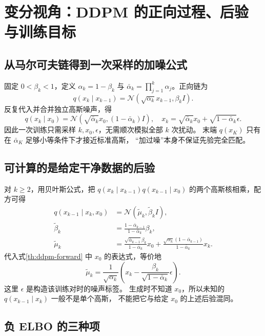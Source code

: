 \chapter{变分视角：DDPM 的正向过程、后验与训练目标}
\label{th:ddpm}

\section{从马尔可夫链得到一次采样的加噪公式}

固定 $0<\beta_k<1$，定义 $\alpha_k=1-\beta_k$ 与
$\bar\alpha_k=\prod_{j=1}^k\alpha_j$。正向链为
\[
q(x_k\mid x_{k-1})=\mathcal N(\sqrt{\alpha_k}x_{k-1},\beta_kI).
\]
反复代入并合并独立高斯噪声，得
\begin{equation}\label{th:ddpm-forward}
q(x_k\mid x_0)=\mathcal N(\sqrt{\bar\alpha_k}x_0,(1-\bar\alpha_k)I),
\quad x_k=\sqrt{\bar\alpha_k}x_0+\sqrt{1-\bar\alpha_k}\epsilon.
\end{equation}
因此一次训练只需采样 $k,x_0,\epsilon$，无需顺次模拟全部 $k$ 次扰动。
末端 $q(x_K)$ 只有在 $\bar\alpha_K$ 足够小等条件下才接近标准高斯，
“加过噪”本身不保证先验完全匹配。

\section{可计算的是给定干净数据的后验}

对 $k\geq2$，用贝叶斯公式，把 $q(x_k\mid x_{k-1})q(x_{k-1}\mid x_0)$
的两个高斯核相乘，配方可得
\begin{align}
q(x_{k-1}\mid x_k,x_0)&=\mathcal N(\tilde\mu_k,\tilde\beta_kI),\\
\tilde\beta_k&=\frac{1-\bar\alpha_{k-1}}{1-\bar\alpha_k}\beta_k,\\
\tilde\mu_k&=\frac{\sqrt{\bar\alpha_{k-1}}\beta_k}{1-\bar\alpha_k}x_0+
 \frac{\sqrt{\alpha_k}(1-\bar\alpha_{k-1})}{1-\bar\alpha_k}x_k.
\end{align}
代入式\eqref{th:ddpm-forward} 中 $x_0$ 的表达式，等价地
\begin{equation}\label{th:ddpm-posterior-mean}
\tilde\mu_k=\frac1{\sqrt{\alpha_k}}
 \left(x_k-\frac{\beta_k}{\sqrt{1-\bar\alpha_k}}\epsilon\right).
\end{equation}
这里 $\epsilon$ 是构造该训练对时的噪声标签。
生成时不知道 $x_0$，所以未知的 $q(x_{k-1}\mid x_k)$ 一般不是单个高斯，
不能把它与给定 $x_0$ 的上述后验混同。

\section{负 ELBO 的三种项}

